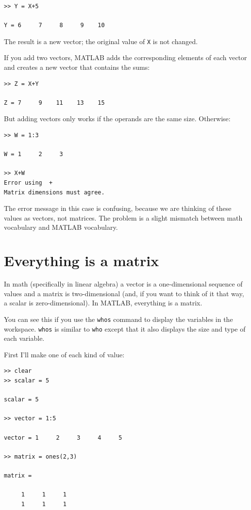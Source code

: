 \documentclass{book}
\begin{document}
\begin{verbatim}
>> Y = X+5

Y = 6     7     8     9    10
\end{verbatim}

The result is a new vector; the original value of {\tt X} is not
changed.

If you add two vectors, MATLAB adds the corresponding elements of each
vector and creates a new vector that contains the sums:

\begin{verbatim}
>> Z = X+Y

Z = 7     9    11    13    15
\end{verbatim}

But adding vectors only works if the operands are the same size.
Otherwise:

\begin{verbatim}
>> W = 1:3

W = 1     2     3

>> X+W
Error using  + 
Matrix dimensions must agree.
\end{verbatim}

The error message in this case is confusing, because we are thinking
of these values as vectors, not matrices.  The problem is a slight
mismatch between math vocabulary and MATLAB vocabulary.


\section{Everything is a matrix}

In math (specifically in linear algebra) a vector is a one-dimensional
sequence of values and a matrix is two-dimensional (and, if you want
to think of it that way, a scalar is zero-dimensional).  In MATLAB,
everything is a matrix.

You can see this if you use the {\tt whos} command to display the
variables in the workspace.  {\tt whos} is similar to {\tt who} except
that it also displays the size and type of each variable.

First I'll make one of each kind of value:

\begin{verbatim}
>> clear
>> scalar = 5

scalar = 5

>> vector = 1:5

vector = 1     2     3     4     5

>> matrix = ones(2,3)

matrix =

     1     1     1
     1     1     1
\end{verbatim}
\end{document}
